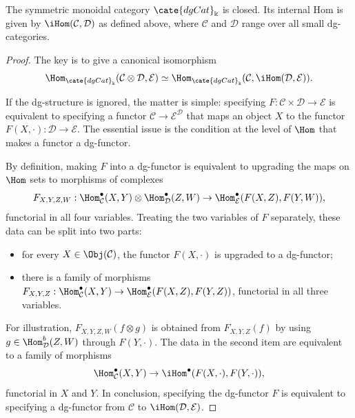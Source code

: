 \begin{proposition}\label{prop:dgCat-closed}
	The symmetric monoidal category $\cate{dgCat}_{\Bbbk}$ is closed. Its
	internal Hom is given by $\iHom(\mathcal{C},\mathcal{D})$ as defined above,
	where $\mathcal{C}$ and $\mathcal{D}$ range over all small dg-categories.
\end{proposition}
\begin{proof}
	The key is to give a canonical isomorphism
	\[ \Hom_{\cate{dgCat}_{\Bbbk}}(\mathcal{C} \otimes \mathcal{D}, \mathcal{E}) \simeq \Hom_{\cate{dgCat}_{\Bbbk}}(\mathcal{C}, \iHom(\mathcal{D}, \mathcal{E}) ). \]

	If the dg-structure is ignored, the matter is simple: specifying
	$F:\mathcal{C}\times\mathcal{D}\to\mathcal{E}$ is equivalent to
	specifying a functor $\mathcal{C}\to\mathcal{E}^{\mathcal{D}}$ that maps
	an object $X$ to the functor
	$F(X,\mathord\cdot):\mathcal{D}\to\mathcal{E}$. The essential issue is
	the condition at the level of $\Hom$ that makes a functor a dg-functor.

	By definition, making $F$ into a dg-functor is equivalent to upgrading the
	maps on $\Hom$ sets to morphisms of complexes
	\[ F_{X, Y, Z, W}: \Hom^\bullet_{\mathcal{C}}(X, Y) \otimes \Hom^\bullet_{\mathcal{D}}(Z, W) \to \Hom^\bullet_{\mathcal{E}}(F(X, Z), F(Y, W)), \]
	functorial in all four variables. Treating the two variables of $F$
	separately, these data can be split into two parts:
	\begin{itemize}
		\item for every $X\in\Obj(\mathcal{C})$, the functor
		$F(X,\mathord\cdot)$ is upgraded to a dg-functor;
		\item there is a family of morphisms
		$F_{X,Y,Z}:\Hom^\bullet_{\mathcal{C}}(X,Y)\to
		\Hom^\bullet_{\mathcal{E}}(F(X,Z),F(Y,Z))$, functorial in all three
		variables.
	\end{itemize}
	For illustration, $F_{X,Y,Z,W}(f\otimes g)$ is obtained from
	$F_{X,Y,Z}(f)$ by using $g\in\Hom^b_{\mathcal{D}}(Z,W)$ through
	$F(Y,\mathord\cdot)$. The data in the second item are equivalent to a
	family of morphisms
	\[ \Hom^\bullet_{\mathcal{C}}(X, Y) \to \iHom^\bullet(F(X, \cdot), F(Y, \cdot)), \]
	functorial in $X$ and $Y$. In conclusion, specifying the dg-functor $F$
	is equivalent to specifying a dg-functor from $\mathcal{C}$ to
	$\iHom(\mathcal{D},\mathcal{E})$.
\end{proof}

